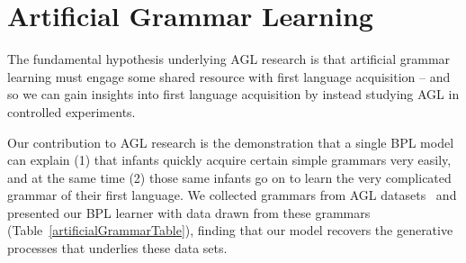 \documentclass{article}
\begin{document}
\section{Artificial Grammar Learning}

The fundamental hypothesis underlying AGL research is that
artificial grammar learning must engage some shared resource with first language acquisition --
and so we can gain insights into first language acquisition by
instead studying AGL in controlled experiments.

Our contribution to AGL research is the demonstration that
a single BPL model can explain (1) that infants quickly acquire
certain simple grammars very easily, and at the same time (2)
those same infants go on to learn
the very complicated grammar of their first language.
We collected grammars from AGL datasets~\cite{gerken2010infants,marcus1999rule,frank2011three}
and presented our BPL learner with data drawn from these grammars (Table~\ref{artificialGrammarTable}),
finding that our model recovers the generative processes that
 underlies these data sets.
\end{document}
